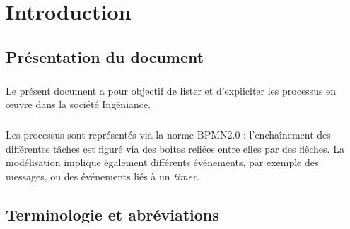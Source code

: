 \documentclass[12pt]{scrreprt}
\author{Direction des opérations}
\date{Avril 2016}
\begin{document}

\tableofcontents

\initIngeniance

\chapter{Introduction}

\section{Présentation du document}
\paragraph{} Le présent document a pour objectif de lister et d'expliciter les processus en œuvre dans la société Ingéniance.
\paragraph{} Les processus sont représentés via la norme BPMN2.0 : l’enchaînement des différentes tâches est figuré via des boites reliées entre elles par des flèches. La modélisation implique également différents événements, par exemple des messages, ou des événements liés à un \textit{timer}.


\section{Terminologie et abréviations}
\end{document}
